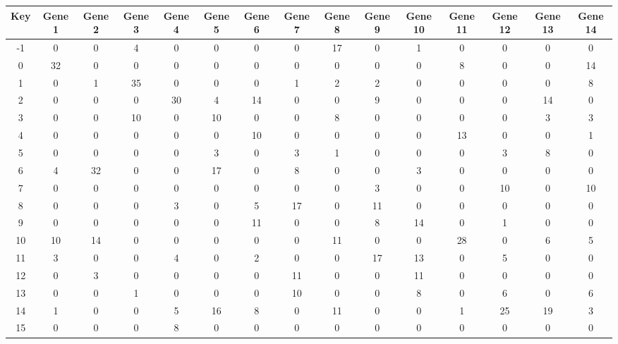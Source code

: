 \begin{tabular}{|c|c|c|c|c|c|c|c|c|c|c|c|c|c|c|}
\hline
Key & Gene 1 & Gene 2 & Gene 3 & Gene 4 & Gene 5 & Gene 6 & Gene 7 & Gene 8 & Gene 9 & Gene 10 & Gene 11 & Gene 12 & Gene 13 & Gene 14 \\
\hline
-1 & 0 & 0 & 4 & 0 & 0 & 0 & 0 & 17 & 0 & 1 & 0 & 0 & 0 & 0 \\
0 & 32 & 0 & 0 & 0 & 0 & 0 & 0 & 0 & 0 & 0 & 8 & 0 & 0 & 14 \\
1 & 0 & 1 & 35 & 0 & 0 & 0 & 1 & 2 & 2 & 0 & 0 & 0 & 0 & 8 \\
2 & 0 & 0 & 0 & 30 & 4 & 14 & 0 & 0 & 9 & 0 & 0 & 0 & 14 & 0 \\
3 & 0 & 0 & 10 & 0 & 10 & 0 & 0 & 8 & 0 & 0 & 0 & 0 & 3 & 3 \\
4 & 0 & 0 & 0 & 0 & 0 & 10 & 0 & 0 & 0 & 0 & 13 & 0 & 0 & 1 \\
5 & 0 & 0 & 0 & 0 & 3 & 0 & 3 & 1 & 0 & 0 & 0 & 3 & 8 & 0 \\
6 & 4 & 32 & 0 & 0 & 17 & 0 & 8 & 0 & 0 & 3 & 0 & 0 & 0 & 0 \\
7 & 0 & 0 & 0 & 0 & 0 & 0 & 0 & 0 & 3 & 0 & 0 & 10 & 0 & 10 \\
8 & 0 & 0 & 0 & 3 & 0 & 5 & 17 & 0 & 11 & 0 & 0 & 0 & 0 & 0 \\
9 & 0 & 0 & 0 & 0 & 0 & 11 & 0 & 0 & 8 & 14 & 0 & 1 & 0 & 0 \\
10 & 10 & 14 & 0 & 0 & 0 & 0 & 0 & 11 & 0 & 0 & 28 & 0 & 6 & 5 \\
11 & 3 & 0 & 0 & 4 & 0 & 2 & 0 & 0 & 17 & 13 & 0 & 5 & 0 & 0 \\
12 & 0 & 3 & 0 & 0 & 0 & 0 & 11 & 0 & 0 & 11 & 0 & 0 & 0 & 0 \\
13 & 0 & 0 & 1 & 0 & 0 & 0 & 10 & 0 & 0 & 8 & 0 & 6 & 0 & 6 \\
14 & 1 & 0 & 0 & 5 & 16 & 8 & 0 & 11 & 0 & 0 & 1 & 25 & 19 & 3 \\
15 & 0 & 0 & 0 & 8 & 0 & 0 & 0 & 0 & 0 & 0 & 0 & 0 & 0 & 0 \\
\hline
\end{tabular}